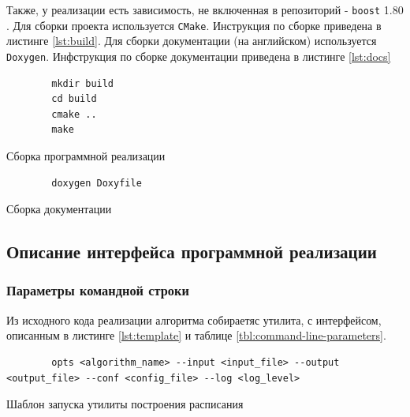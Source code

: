 Также, у реализации есть зависимость, не включенная в репозиторий - \texttt{boost} 1.80 \cite{boost_framework}. Для сборки проекта используется \texttt{CMake}. Инструкция по сборке приведена в листинге \ref{lst:build}. Для сборки документации (на английском) используется \texttt{Doxygen}. Инфструкция по сборке документации приведена в листинге \ref{lst:docs}

\begin{listing}[!htbp]
    \begin{verbatim}
        mkdir build
        cd build
        cmake ..
        make
    \end{verbatim}
    \caption{Сборка программной реализации}
    \label{lst:build}
\end{listing}

\begin{listing}[!htbp]
    \begin{verbatim}
        doxygen Doxyfile
    \end{verbatim}
    \caption{Сборка документации}
    \label{lst:docs}
\end{listing}


\subsection{Описание интерфейса программной реализации}
\subsubsection{Параметры командной строки}
Из исходного кода реализации алгоритма собираетяс утилита, с интерфейсом, описанным в листинге \ref{lst:template} и таблице \ref{tbl:command-line-parameters}. 
\begin{listing}[!htbp]
    \begin{verbatim}
        opts <algorithm_name> --input <input_file> --output <output_file> --conf <config_file> --log <log_level>
    \end{verbatim}
    \caption{Шаблон запуска утилиты построения расписания}
    \label{lst:template}
\end{listing}

